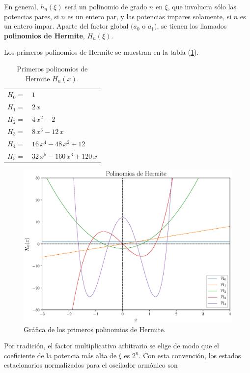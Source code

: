 En general, $h_{n} (\xi)$ será un polinomio de grado $n$ en $\xi$, que involucra sólo las potencias pares, si $n$ es un entero par, y las potencias impares solamente, si $n$ es un entero impar. Aparte del factor global $(a_{0}$ o $a_{1})$, se tienen los llamados \textbf{polinomios de Hermite}, $H_{n} (\xi)$.
\par
Los primeros polinomios de Hermite se muestran en la tabla (\ref{tabla_001}).
\begin{table}[H]
\centering
\begin{tabular}{l l}
$H_{0} =$ & $1$ \\
$H_{1} =$ & $2 \, x$ \\
$H_{2} =$ & $4 \, x^{2} - 2 $ \\
$H_{3} =$ & $8 \, x^{3} - 12 \, x$ \\
$H_{4} =$ & $16 \, x^{4} - 48 \, x^{2} + 12 $ \\
$H_{5} =$ & $32 \, x^{5} - 160 \, x^{3} + 120 \, x $
\end{tabular}
\caption{Primeros polinomios de Hermite $H_{n}(x)$.}
\label{tabla_001}
\end{table}
\begin{figure}[H]
    \centering
    \includegraphics[scale=0.7]{Imagenes/Polinomios_Hermite_01.eps}
    \caption{Gráfica de los primeros polinomios de Hermite.}
    \label{figura_003}
\end{figure}
Por tradición, el factor multiplicativo arbitrario se elige de modo que el coeficiente de la potencia más alta de $\xi$ es $2^{n}$. Con esta convención, los estados estacionarios normalizados para el oscilador armónico son
